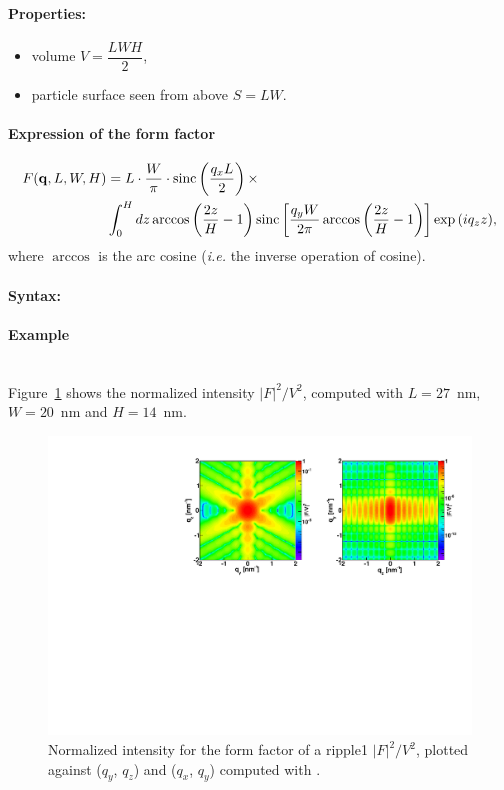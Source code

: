 \paragraph{Properties:}
\begin{itemize}
\item volume $V = \dfrac{L W H}{2} $,
\item particle surface seen from above $S = L W$.
\end{itemize}

\paragraph{Expression of the form factor}
\begin{align*}
F(\mathbf{q},L,W,H) &=L \cdot \frac{W}{\pi}\cdot \operatorname{sinc}\left(\frac{q_xL}{2}\right)\times \\ &\int_0^H{dz \arccos\left(\frac{2z}{H}-1\right)\operatorname{sinc}\left[\frac{q_yW}{2\pi}\arccos\left(\frac{2z}{H} - 1\right)\right]\exp\left(iq_zz\right)},
\end{align*}
where $\arccos$ is the  arc cosine (\textit{i.e.} the inverse
operation of cosine).

\paragraph{Syntax:} 

\paragraph{Example}\mbox{}\\
Figure~\ref{fig:FFripple1Ex} shows the normalized intensity
$|F|^2/V^2$, computed with $L=27$~nm, $W=20$~nm and $H=14$~nm.

\begin{figure}[ht]
\begin{center}
\includegraphics[angle=-90,width=\textwidth]{Figures/ff/figffripple1.pdf}
\end{center}
\caption{Normalized intensity for the form factor of a ripple1
  $|F|^2/V^2$, plotted against ($q_y$, $q_z$) and  ($q_x$, $q_y$)
  computed with .}
\label{fig:FFripple1Ex}
\end{figure}

